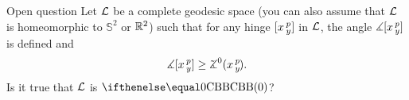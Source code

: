 \begin{thm}{Open question}\label{open:hinge-}
Let $\mathcal{L}$ be a complete geodesic space (you can also assume that $\mathcal{L}$ is homeomorphic to $\mathbb{S}^2$ or $\mathbb{R}^2$) 
such that for any hinge $[x\,{}^{p}_{y}]$ in $\mathcal{L}$, 
the angle $\measuredangle[x\,{}^{p}_{y}]$ is defined and 
\[\mangle\hinge x p y\ge\angk0 x p y.\]
Is it true that $\mathcal{L}$ is $\Alex{0}$?
\end{thm}









